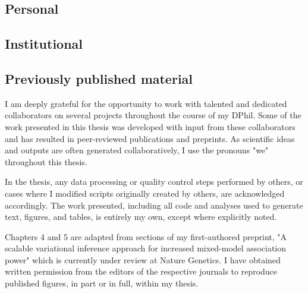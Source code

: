 \subsection*{Personal}



\subsection*{Institutional}


\subsection*{Previously published material}
I am deeply grateful for the opportunity to work with talented and dedicated collaborators on several projects throughout the course of my DPhil. Some of the work presented in this thesis was developed with input from these collaborators and has resulted in peer-reviewed publications and preprints. As scientific ideas and outputs are often generated collaboratively, I use the pronouns "we" throughout this thesis.

In the thesis, any data processing or quality control steps performed by others, or cases where I modified scripts originally created by others, are acknowledged accordingly. The work presented, including all code and analyses used to generate text, figures, and tables, is entirely my own, except where explicitly noted.

Chapters 4 and 5 are adapted from sections of my first-authored preprint, "A scalable variational inference approach for increased mixed-model association power" which is currently under review at Nature Genetics. I have obtained written permission from the editors of the respective journals to reproduce published figures, in part or in full, within my thesis.